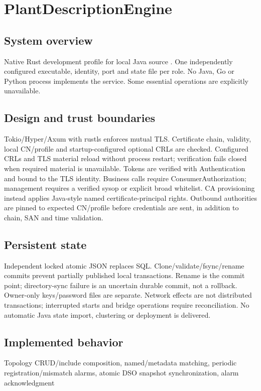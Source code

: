 \documentclass[a4paper]{arrowhead}
\begin{document}
\ArrowheadSetup
\section{PlantDescriptionEngine}
\subsection{System overview}
Native Rust development profile for local Java source . One independently configured executable, identity, port and state file per role. No Java, Go or Python process implements the service. Some essential operations are explicitly unavailable.
\subsection{Design and trust boundaries}
Tokio/Hyper/Axum with rustls enforces mutual TLS. Certificate chain, validity, local CN/profile and startup-configured optional CRLs are checked. Configured CRLs and TLS material reload without process restart; verification fails closed when required material is unavailable. Tokens are verified with Authentication and bound to the TLS identity. Business calls require ConsumerAuthorization; management requires a verified sysop or explicit broad whitelist. CA provisioning instead applies Java-style named certificate-principal rights. Outbound authorities are pinned to expected CN/profile before credentials are sent, in addition to chain, SAN and time validation.
\subsection{Persistent state}
Independent locked atomic JSON replaces SQL. Clone/validate/fsync/rename commits prevent partially published local transactions. Rename is the commit point; directory-sync failure is an uncertain durable commit, not a rollback. Owner-only keys/password files are separate. Network effects are not distributed transactions; interrupted starts and bridge operations require reconciliation. No automatic Java state import, clustering or deployment is delivered.
\subsection{Implemented behavior}
Topology CRUD/include composition, named/metadata matching, periodic registration/mismatch alarms, atomic DSO snapshot synchronization, alarm acknowledgment
\end{document}
